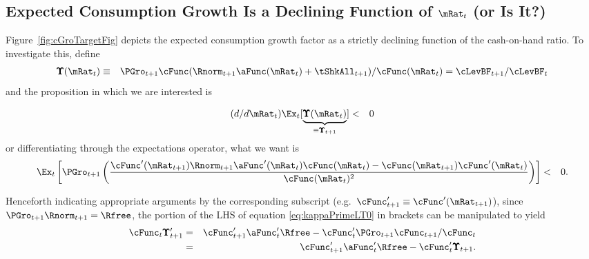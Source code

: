 \documentclass[titlepage]{\econtex}\providecommand{\texname}{BufferStockTheory}%
\begin{document}
{\hypertarget{dcgdxneg}{}
\subsection{Expected Consumption Growth Is a Declining Function of $\mRat_{t}$ (or Is It?)}
\label{subsec:dcgdxneg}

Figure~\ref{fig:cGroTargetFig} depicts the expected consumption growth factor as a strictly
declining function of the cash-on-hand ratio. To investigate this,
define
\begin{eqnarray*}
\pmb{\Upsilon}(\mRat_{t}) & \equiv & \PGro_{t+1} \cFunc(\Rnorm_{t+1}\aFunc(\mRat_{t})+\tShkAll_{t+1})/\cFunc(\mRat_{t})  = \cLevBF_{t+1}/\cLevBF_{t}
\end{eqnarray*}
and the proposition in which we are interested is

\begin{eqnarray}
  (d/d\mRat_{t})\Ex_{t}[\underbrace{\pmb{\Upsilon}(\mRat_{t})}_{\equiv \pmb{\Upsilon}_{t+1}}] & < & 0 \label{eq:dChi}  \nonumber
\end{eqnarray}
or differentiating through the expectations operator, what we want is
\begin{eqnarray}
\Ex_{t}\left[\PGro_{t+1} \left(\frac{\cFunc^{\prime}(\mRat_{t+1})\Rnorm_{t+1}\aFunc^{\prime}(\mRat_{t})\cFunc(\mRat_{t})-\cFunc(\mRat_{t+1})\cFunc^{\prime}(\mRat_{t})}{\cFunc(\mRat_{t})^{2}}\right)\right] & < & 0 \label{eq:kappaPrimeLT0}.
\end{eqnarray}

Henceforth indicating appropriate arguments by the corresponding
subscript (e.g.\ $\cFunc_{t+1}^{\prime} \equiv \cFunc^{\prime}(\mRat_{t+1})$), since
$\PGro_{t+1}\Rnorm_{t+1}=\Rfree$, the portion of the LHS of equation \eqref{eq:kappaPrimeLT0} in brackets can be manipulated to yield
\begin{eqnarray}
 \cFunc_{t} \pmb{\Upsilon}^{\prime}_{t+1} & = & \cFunc^{\prime}_{t+1}\aFunc^{\prime}_{t}\Rfree-\cFunc^{\prime}_{t} \PGro_{t+1} \cFunc_{t+1}/\cFunc_{t} \nonumber
\\ & = & \cFunc^{\prime}_{t+1}\aFunc^{\prime}_{t}\Rfree-\cFunc^{\prime}_{t} \pmb{\Upsilon}_{t+1} \label{eq:cPrimek}
.
\end{eqnarray}

}
\end{document}
